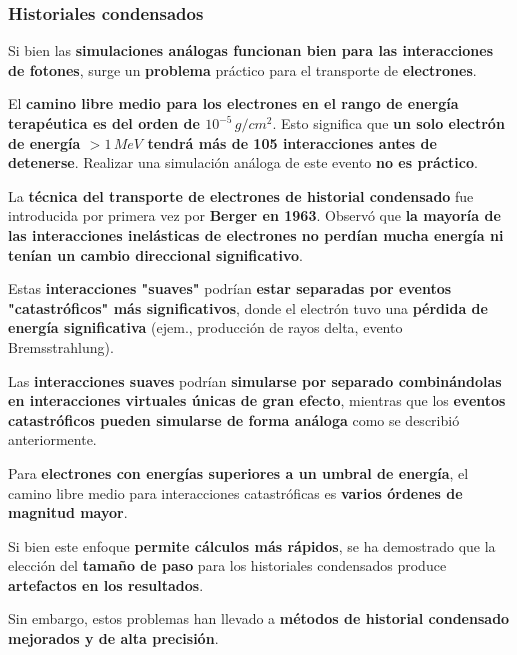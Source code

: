 \documentclass[aspectratio=169,xcolor=dvipsnames,t]{beamer}
\begin{document}
\begin{frame}

    \frametitle{Historiales condensados}

    Si bien las \textbf{simulaciones análogas funcionan bien para las interacciones de fotones}, surge un \textbf{problema} práctico para el transporte de \textbf{electrones}.

    El \textbf{camino libre medio para los electrones en el rango de energía terapéutica es del orden de $10^{-5} \, g/cm^2$}. Esto significa que \textbf{un solo electrón de energía $>1 \, MeV$ tendrá más de 105 interacciones antes de detenerse}. Realizar una simulación análoga de este evento \textbf{no es práctico}.

    La \textbf{técnica del transporte de electrones de historial condensado} fue introducida por primera vez por \textbf{Berger en 1963}. Observó que \textbf{la mayoría de las interacciones inelásticas de electrones no perdían mucha energía ni tenían un cambio direccional significativo}.

    Estas \textbf{interacciones "suaves"} podrían \textbf{estar separadas por eventos "catastróficos" más significativos}, donde el electrón tuvo una \textbf{pérdida de energía significativa} (ejem., producción de rayos delta, evento Bremsstrahlung).

\end{frame}

\begin{frame}

    \vspace{1cm}

    Las \textbf{interacciones suaves} podrían \textbf{simularse por separado combinándolas en interacciones virtuales únicas de gran efecto}, mientras que los \textbf{eventos catastróficos pueden simularse de forma análoga} como se describió anteriormente.

    Para \textbf{electrones con energías superiores a un umbral de energía}, el camino libre medio para interacciones catastróficas es \textbf{varios órdenes de magnitud mayor}.

    Si bien este enfoque \textbf{permite cálculos más rápidos}, se ha demostrado que la elección del \textbf{tamaño de paso} para los historiales condensados produce \textbf{artefactos en los resultados}.
    
    Sin embargo, estos problemas han llevado a \textbf{métodos de historial condensado mejorados y de alta precisión}.

\end{frame}
\end{document}
